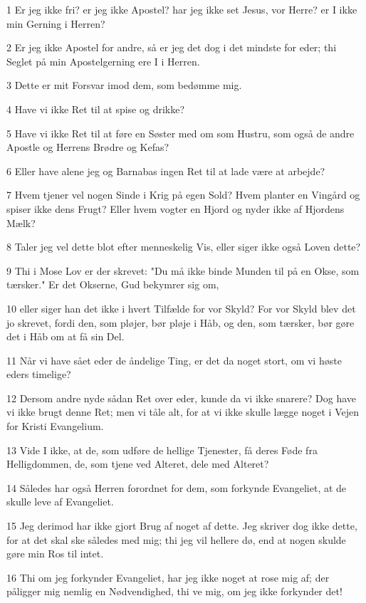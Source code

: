 \par 1 Er jeg ikke fri? er jeg ikke Apostel? har jeg ikke set Jesus, vor Herre? er I ikke min Gerning i Herren?
\par 2 Er jeg ikke Apostel for andre, så er jeg det dog i det mindste for eder; thi Seglet på min Apostelgerning ere I i Herren.
\par 3 Dette er mit Forsvar imod dem, som bedømme mig.
\par 4 Have vi ikke Ret til at spise og drikke?
\par 5 Have vi ikke Ret til at føre en Søster med om som Hustru, som også de andre Apostle og Herrens Brødre og Kefas?
\par 6 Eller have alene jeg og Barnabas ingen Ret til at lade være at arbejde?
\par 7 Hvem tjener vel nogen Sinde i Krig på egen Sold? Hvem planter en Vingård og spiser ikke dens Frugt? Eller hvem vogter en Hjord og nyder ikke af Hjordens Mælk?
\par 8 Taler jeg vel dette blot efter menneskelig Vis, eller siger ikke også Loven dette?
\par 9 Thi i Mose Lov er der skrevet: "Du må ikke binde Munden til på en Okse, som tærsker." Er det Okserne, Gud bekymrer sig om,
\par 10 eller siger han det ikke i hvert Tilfælde for vor Skyld? For vor Skyld blev det jo skrevet, fordi den, som pløjer, bør pløje i Håb, og den, som tærsker, bør gøre det i Håb om at få sin Del.
\par 11 Når vi have sået eder de åndelige Ting, er det da noget stort, om vi høste eders timelige?
\par 12 Dersom andre nyde sådan Ret over eder, kunde da vi ikke snarere? Dog have vi ikke brugt denne Ret; men vi tåle alt, for at vi ikke skulle lægge noget i Vejen for Kristi Evangelium.
\par 13 Vide I ikke, at de, som udføre de hellige Tjenester, få deres Føde fra Helligdommen, de, som tjene ved Alteret, dele med Alteret?
\par 14 Således har også Herren forordnet for dem, som forkynde Evangeliet, at de skulle leve af Evangeliet.
\par 15 Jeg derimod har ikke gjort Brug af noget af dette. Jeg skriver dog ikke dette, for at det skal ske således med mig; thi jeg vil hellere dø, end at nogen skulde gøre min Ros til intet.
\par 16 Thi om jeg forkynder Evangeliet, har jeg ikke noget at rose mig af; der påligger mig nemlig en Nødvendighed, thi ve mig, om jeg ikke forkynder det!
